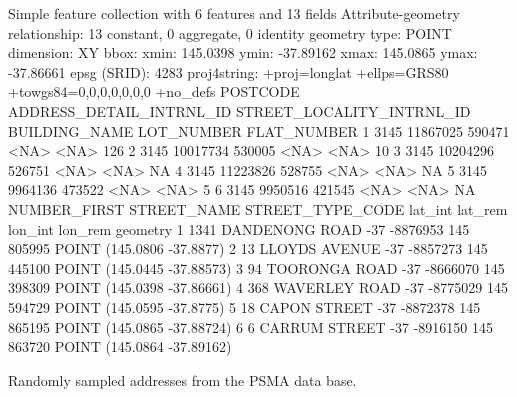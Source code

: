 \documentclass[utf8]{frontiers_suppmat} %
\begin{document}
\begin{table}[h]
\begin{verbnobox}[\fontsize{8pt}{8pt}\selectfont]
Simple feature collection with 6 features and 13 fields
Attribute-geometry relationship: 13 constant, 0 aggregate, 0 identity
geometry type:  POINT
dimension:      XY
bbox:           xmin: 145.0398 ymin: -37.89162 xmax: 145.0865 ymax: -37.86661
epsg (SRID):    4283
proj4string:    +proj=longlat +ellps=GRS80 +towgs84=0,0,0,0,0,0,0 +no_defs
  POSTCODE ADDRESS_DETAIL_INTRNL_ID STREET_LOCALITY_INTRNL_ID BUILDING_NAME LOT_NUMBER FLAT_NUMBER
1     3145                 11867025                    590471          <NA>       <NA>         126
2     3145                 10017734                    530005          <NA>       <NA>          10
3     3145                 10204296                    526751          <NA>       <NA>          NA
4     3145                 11223826                    528755          <NA>       <NA>          NA
5     3145                  9964136                    473522          <NA>       <NA>           5
6     3145                  9950516                    421545          <NA>       <NA>          NA
  NUMBER_FIRST STREET_NAME STREET_TYPE_CODE lat_int  lat_rem lon_int lon_rem                   geometry
1         1341   DANDENONG             ROAD     -37 -8876953     145  805995  POINT (145.0806 -37.8877)
2           13      LLOYDS           AVENUE     -37 -8857273     145  445100 POINT (145.0445 -37.88573)
3           94    TOORONGA             ROAD     -37 -8666070     145  398309 POINT (145.0398 -37.86661)
4          368    WAVERLEY             ROAD     -37 -8775029     145  594729  POINT (145.0595 -37.8775)
5           18       CAPON           STREET     -37 -8872378     145  865195 POINT (145.0865 -37.88724)
6            6      CARRUM           STREET     -37 -8916150     145  863720 POINT (145.0864 -37.89162)
\end{verbnobox}
\caption{Randomly sampled addresses from the PSMA data base.\label{tab:headpsma}}
\end{table}
\end{document}
